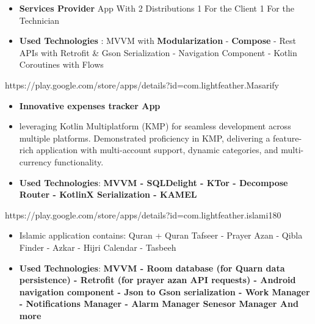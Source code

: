 \documentclass[10pt,a4paper,ragged2e,withhyper]{altacv}
\begin{document}
    \begin{paracol}{1}

        \begin{itemize}
            \item \textbf{Services Provider} App With 2 Distributions 1 For the Client 1 For the Technician
            \item \textbf{Used Technologies} : MVVM with \textbf{Modularization} - \textbf{Compose} - Rest APIs with Retrofit \& Gson Serialization - Navigation Component - Kotlin Coroutines with Flows
        \end{itemize}
        \divider



        {\cvrepo{|\faGooglePlay\faAndroid}
        {https://play.google.com/store/apps/details?id=com.lightfeather.Masarify}}{}{}
        \begin{itemize}
            \item \textbf{Innovative expenses tracker App}
            \item leveraging Kotlin Multiplatform (KMP) for seamless development across multiple platforms.
            Demonstrated proficiency in KMP,
            delivering a feature-rich application with multi-account support, dynamic categories, and multi-currency functionality.
            \item \textbf{Used Technologies}: \textbf{MVVM -
            SQLDelight - KTor - Decompose Router - KotlinX Serialization - KAMEL
            }
        \end{itemize}
        \divider


        {\cvrepo{|\faGooglePlay\faAndroid}
        {https://play.google.com/store/apps/details?id=com.lightfeather.islami180}}{}{}
        \begin{itemize}
            \item \textbf{}Islamic application contains:
            Quran + Quran Tafseer - Prayer Azan - Qibla Finder - Azkar - Hijri Calendar - Tasbeeh
            \item \textbf{Used Technologies}: \textbf{MVVM -
            Room database (for Quarn data persistence) -
            Retrofit (for prayer azan API requests) -
            Android navigation component -
            Json to Gson serialization -
            Work Manager -
            Notifications Manager -
            Alarm Manager
            Senesor Manager And more
            }
        \end{itemize}
        \divider


\end{paracol}
\end{document}
